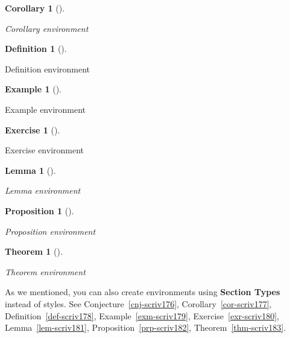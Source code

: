 \documentclass[
  12pt,
  a4paper,
  numbers=noenddot,
  titlepage,
  toclink=all,
  toc=bibliography]{scrbook}
\theoremstyle{plain}
\newtheorem{lemma}{Lemma}[section]
\theoremstyle{plain}
\newtheorem{proposition}{Proposition}[section]
\theoremstyle{definition}
\newtheorem{exercise}{Exercise}[section]
\theoremstyle{plain}
\newtheorem{theorem}{Theorem}[section]
\theoremstyle{definition}
\newtheorem{example}{Example}[section]
\theoremstyle{definition}
\newtheorem{definition}{Definition}[section]
\theoremstyle{plain}
\newtheorem{corollary}{Corollary}[section]
\theoremstyle{plain}
\theoremstyle{remark}
\begin{document}
\begin{corollary}[]\protect\hypertarget{cor-scriv175}{}\label{cor-scriv175}

Corollary environment

\end{corollary}

\begin{definition}[]\protect\hypertarget{def-scriv175}{}\label{def-scriv175}

Definition environment

\end{definition}

\begin{example}[]\protect\hypertarget{exm-scriv175}{}\label{exm-scriv175}

Example environment

\end{example}

\begin{exercise}[]\protect\hypertarget{exr-scriv175}{}\label{exr-scriv175}

Exercise environment

\end{exercise}

\begin{lemma}[]\protect\hypertarget{lem-scriv175}{}\label{lem-scriv175}

Lemma environment

\end{lemma}

\begin{proposition}[]\protect\hypertarget{prp-scriv175}{}\label{prp-scriv175}

Proposition environment

\end{proposition}

\begin{theorem}[]\protect\hypertarget{thm-scriv175}{}\label{thm-scriv175}

Theorem environment

\end{theorem}

As we mentioned, you can also create environments using \textbf{Section
Types} instead of styles. See
\protect\hypertarget{cite_45}{}{\label{cite_45}Conjecture~\ref{cnj-scriv176}},
\protect\hypertarget{cite_46}{}{\label{cite_46}Corollary~\ref{cor-scriv177}},
\protect\hypertarget{cite_47}{}{\label{cite_47}Definition~\ref{def-scriv178}},
\protect\hypertarget{cite_48}{}{\label{cite_48}Example~\ref{exm-scriv179}},
\protect\hypertarget{cite_49}{}{\label{cite_49}Exercise~\ref{exr-scriv180}},
\protect\hypertarget{cite_50}{}{\label{cite_50}Lemma~\ref{lem-scriv181}},
\protect\hypertarget{cite_51}{}{\label{cite_51}Proposition~\ref{prp-scriv182}},
\protect\hypertarget{cite_52}{}{\label{cite_52}Theorem~\ref{thm-scriv183}}.
\end{document}
